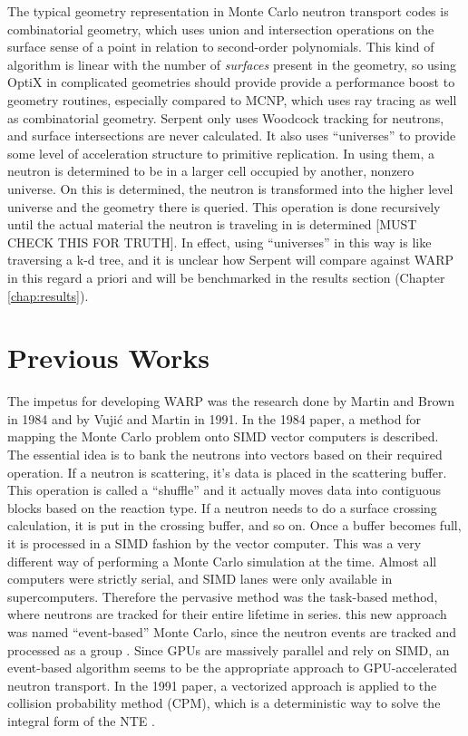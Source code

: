 The typical geometry representation in Monte Carlo neutron transport codes is combinatorial geometry, which uses union and intersection operations on the surface sense  of a point in relation to second-order polynomials.  This kind of algorithm is linear with the number of \emph{surfaces} present in the geometry, so using OptiX in complicated geometries should provide provide a performance boost to geometry routines, especially compared to MCNP, which uses ray tracing as well as combinatorial geometry.  Serpent only uses Woodcock tracking for neutrons, and surface intersections are never calculated.  It also uses ``universes'' to provide some level of acceleration structure to primitive replication.  In using them, a neutron is determined to be in a larger cell occupied by another, nonzero universe.  On this is determined, the neutron is transformed into the higher level universe and the geometry there is queried.  This operation is done recursively until the actual material the neutron is traveling in is determined \cite{jaakko}[MUST CHECK THIS FOR TRUTH].  In effect, using ``universes'' in this way is like traversing a k-d tree, and it is unclear how Serpent will compare against WARP in this regard a priori and will be benchmarked in the results section (Chapter \ref{chap:results}).


\section{Previous Works}

The impetus for developing WARP was the research done by Martin and Brown in 1984 and by Vuji\'{c} and Martin in 1991.  In the 1984 paper, a method for mapping the Monte Carlo problem onto SIMD vector computers is described.  The essential idea is to bank the neutrons into vectors based on their required operation.  If a neutron is scattering, it's data is placed in the scattering buffer.  This operation is called a ``shuffle'' and it actually moves data into contiguous blocks based on the reaction type.  If a neutron needs to do a surface crossing calculation, it is put in the crossing buffer, and so on.  Once a buffer becomes full, it is processed in a SIMD fashion by the vector computer.  This was a very different way of performing a Monte Carlo simulation at the time.  Almost all computers were strictly serial, and SIMD lanes were only available in supercomputers.  Therefore the pervasive method was the task-based method, where neutrons are tracked for their entire lifetime in series.  this new approach was named ``event-based'' Monte Carlo, since the neutron events are tracked and processed as a group \cite{vector}.  Since GPUs are massively parallel and rely on SIMD, an event-based algorithm seems to be the appropriate approach to GPU-accelerated neutron transport.  In the 1991 paper, a vectorized approach is applied to the collision probability method (CPM), which is a deterministic way to solve the integral form of the NTE \cite{vujic_vector}.

